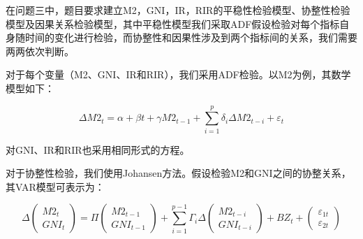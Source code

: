


在问题三中，题目要求建立M2，GNI，IR，RIR的平稳性检验模型、协整性检验模型及因果关系检验模型，其中平稳性模型我们采取ADF假设检验对每个指标自身随时间的变化进行检验，而协整性和因果性涉及到两个指标间的关系，我们需要两两依次判断。


对于每个变量（M2、GNI、IR和RIR），我们采用ADF检验。以M2为例，其数学模型如下：

\begin{equation}
	\Delta M2_t = \alpha + \beta t + \gamma M2_{t-1} + \sum_{i=1}^{p} \delta_i \Delta M2_{t-i} + \varepsilon_t
\end{equation}

对GNI、IR和RIR也采用相同形式的方程。


对于协整性检验，我们使用Johansen方法。假设检验M2和GNI之间的协整关系，其VAR模型可表示为：

\begin{equation}
	\Delta \begin{pmatrix} M2_t \\ GNI_t \end{pmatrix} = \Pi \begin{pmatrix} M2_{t-1} \\ GNI_{t-1} \end{pmatrix} + \sum_{i=1}^{p-1} \Gamma_i \Delta \begin{pmatrix} M2_{t-i} \\ GNI_{t-i} \end{pmatrix} + BZ_t + \begin{pmatrix} \varepsilon_{1t} \\ \varepsilon_{2t} \end{pmatrix}
\end{equation}


